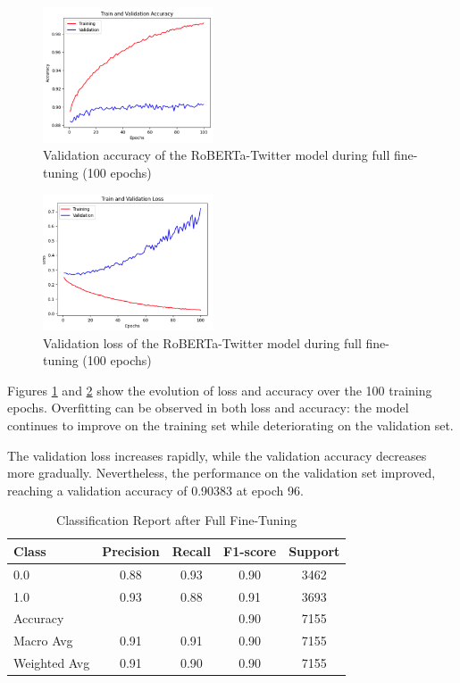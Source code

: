 \begin{figure}[H]
    \centering
    \includegraphics[width=0.45\textwidth]{images/robertaValidationAccuray100Epoch.png}
    \caption{Validation accuracy of the RoBERTa-Twitter model during full fine-tuning (100 epochs)}
    \label{fig:roberta_validation_accuracy_100epoch}
\end{figure}

\begin{figure}[H]
    \centering
    \includegraphics[width=0.45\textwidth]{images/robertaValidationLost100Epoch.png}
    \caption{Validation loss of the RoBERTa-Twitter model during full fine-tuning (100 epochs)}
    \label{fig:roberta_validation_loss_100epoch}
\end{figure}

Figures \ref{fig:roberta_validation_accuracy_100epoch} and \ref{fig:roberta_validation_loss_100epoch} show the evolution of loss and accuracy over the 100 training epochs. Overfitting can be observed in both loss and accuracy: the model continues to improve on the training set while deteriorating on the validation set. 

The validation loss increases rapidly, while the validation accuracy decreases more gradually. Nevertheless, the performance on the validation set improved, reaching a validation accuracy of 0.90383 at epoch 96.

\begin{table}[H]
\centering
\caption{Classification Report after Full Fine-Tuning}
\label{tab:classification_report_final}
\begin{tabular}{lcccc}
\toprule
Class        & Precision & Recall & F1-score & Support \\
\midrule
0.0          & 0.88      & 0.93   & 0.90     & 3462    \\
1.0          & 0.93      & 0.88   & 0.91     & 3693    \\
\midrule
Accuracy     &           &        & 0.90     & 7155    \\
Macro Avg    & 0.91      & 0.91   & 0.90     & 7155    \\
Weighted Avg & 0.91      & 0.90   & 0.90     & 7155    \\
\bottomrule
\end{tabular}
\end{table}


